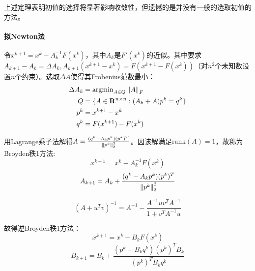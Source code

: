 \documentclass{ctexart}
\begin{document}
上述定理表明初值的选择将显著影响收敛性，但遗憾的是并没有一般的选取初值的方法。
\paragraph{拟Newton法}令$x^{k+1}=x^k-A_k^{-1}F(x^k)$，其中$A_k$是$F'(x^k)$的近似。其中要求$A_{k+1}-A_k=\Delta A_k,A_{k+1}(x^{k+1}-x^k)=F(x^{k+1}-F(x^k))$（对$n^2$个未知数设置$n$个约束）。选取$\Delta A$使得其Frobenius范数最小：
\begin{align*}
\Delta A_k&=\mathrm{argmin}_{A\in Q}\left\|A \right\|_F\\
Q&=\{A\in \mathbf{R}^{n\times n}:(A_k+A)p^k=q^k\}\\
p^k&=x^{k+1}-x^k\\
q^k&=F(x^{k+1})-F(x^k)
\end{align*}

用Lagrange乘子法解得$A=\frac{(q^k-A_kp^k)(p^k)^T}{\left\|p^k \right\|_2^2}$。因该解满足$\mathrm{rank}(A)=1$，故称为Broyden秩1方法:
\[x^{k+1}=x^k-A_k^{-1}F(x^k)\]
\[A_{k+1}=A_k+\frac{(q^k-A_kp^k)(p^k)^T}{\left\|p^k \right\|_2^2}\]

\begin{Thm}
\[(A+u^Tv)^{-1}=A^{-1}-\frac{A^{-1}uv^TA^{-1}}{1+v^TA^{-1}u}\]
\end{Thm}

故得逆Broyden秩1方法：
\[x^{k+1}=x^k-B_kF(x^k)\]
\[B_{k+1}=B_k+\frac{(p^k-B_kq^k)(p^k)^TB_k}{(p^k)^TB_kq^k}\]
\end{document}
